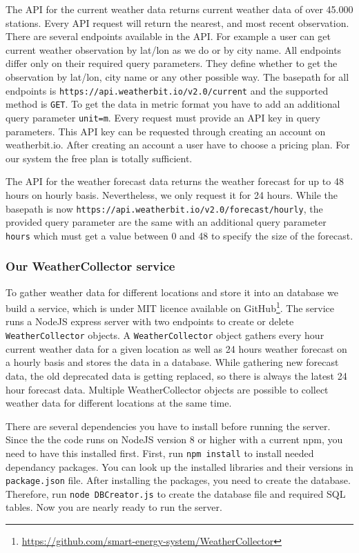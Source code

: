 The API for the current weather data returns current weather data of over 45.000 stations.
Every API request will return the nearest, and most recent observation.
There are several endpoints available in the API.
For example a user can get current weather observation by lat/lon as we do or by city name.
All endpoints differ only on their required query parameters.
They define whether to get the observation by lat/lon, city name or any other possible way.
The basepath for all endpoints is \texttt{https://api.weatherbit.io/v2.0/current} and the supported method is \texttt{GET}.
To get the data in metric format you have to add an additional query parameter \texttt{unit=m}.
Every request must provide an API key in query parameters.\cite{weatherbit}
This API key can be requested through creating an account on weatherbit.io.
After creating an account a user have to choose a pricing plan.
For our system the free plan is totally sufficient.

The API for the weather forecast data returns the weather forecast for up to 48 hours on hourly basis.
Nevertheless, we only request it for 24 hours.
While the basepath is now \texttt{https://api.weatherbit.io/v2.0/forecast/hourly}, the provided query parameter are the same with an additional query parameter \texttt{hours} which must get a value between 0 and 48 to specify the size of the forecast.

\subsubsection{Our WeatherCollector service}\label{sec:weathercollector}
To gather weather data for different locations and store it into an database we build a service, which is under MIT licence available on GitHub\footnote{\url{https://github.com/smart-energy-system/WeatherCollector}}.
The service runs a NodeJS express server with two endpoints to create or delete \texttt{WeatherCollector} objects. 
A \texttt{WeatherCollector} object gathers every hour current weather data for a given location as well as 24 hours weather forecast on a hourly basis and stores the data in a database. 
While gathering new forecast data, the old deprecated data is getting replaced, so there is always the latest 24 hour forecast data. Multiple WeatherCollector objects are possible to collect weather data for different locations at the same time.

There are several dependencies you have to install before running the server. 
Since the the code runs on NodeJS version 8 or higher with a current npm, you need to have this installed first.
First, run \texttt{npm install} to install needed dependancy packages. 
You can look up the installed libraries and their versions in \texttt{package.json} file. 
After installing the packages, you need to create the database. 
Therefore, run \texttt{node DBCreator.js} to create the database file and required SQL tables. 
Now you are nearly ready to run the server.

